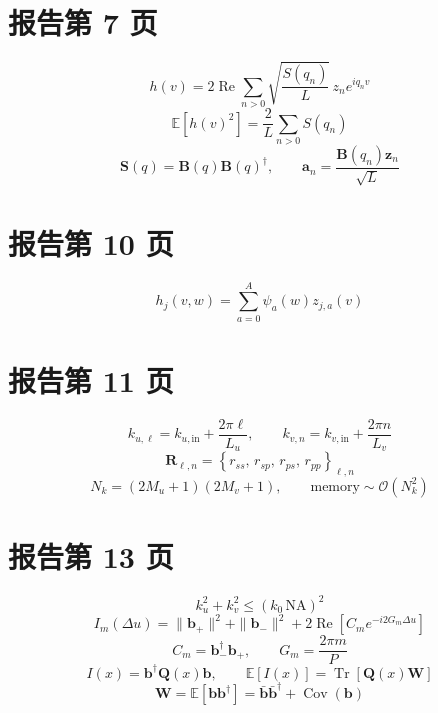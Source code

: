 \documentclass[UTF8,11pt,a4paper]{ctexart}
\begin{document}
\section*{报告第 7 页}
\begin{equation*}
 h(v)=2\operatorname{Re}\sum_{n>0}\sqrt{\frac{S(q_n)}{L}}\,z_n e^{iq_n v}
\end{equation*}
\begin{equation*}
 \mathbb{E}[h(v)^2]=\frac{2}{L}\sum_{n>0}S(q_n)
\end{equation*}
\begin{equation*}
 \mathbf{S}(q)=\mathbf{B}(q)\mathbf{B}(q)^\dagger,\qquad \mathbf{a}_n=\frac{\mathbf{B}(q_n)\mathbf{z}_n}{\sqrt L}
\end{equation*}

\section*{报告第 10 页}
\begin{equation*}
 h_j(v,w)=\sum_{a=0}^{A}\psi_a(w)z_{j,a}(v)
\end{equation*}

\section*{报告第 11 页}
\begin{equation*}
 k_{u,\ell}=k_{u,\mathrm{in}}+\frac{2\pi\ell}{L_u},\qquad k_{v,n}=k_{v,\mathrm{in}}+\frac{2\pi n}{L_v}
\end{equation*}
\begin{equation*}
 \mathbf{R}_{\ell,n}=\left\{r_{ss},\,r_{sp},\,r_{ps},\,r_{pp}\right\}_{\ell,n}
\end{equation*}
\begin{equation*}
 N_k=(2M_u+1)(2M_v+1),\qquad \text{memory}\sim\mathcal{O}(N_k^2)
\end{equation*}

\section*{报告第 13 页}
\begin{equation*}
 k_u^2+k_v^2\leq(k_0\,\mathrm{NA})^2
\end{equation*}
\begin{equation*}
 I_m(\Delta u)=\|\mathbf{b}_+\|^2+\|\mathbf{b}_-\|^2+2\operatorname{Re}\!\left[C_m e^{-i2G_m\Delta u}\right]
\end{equation*}
\begin{equation*}
 C_m=\mathbf{b}_-^\dagger\mathbf{b}_+,\qquad G_m=\frac{2\pi m}{P}
\end{equation*}
\begin{equation*}
 I(x)=\mathbf{b}^\dagger\mathbf{Q}(x)\mathbf{b},\qquad\mathbb{E}[I(x)]=\operatorname{Tr}\!\left[\mathbf{Q}(x)\mathbf{W}\right]
\end{equation*}
\begin{equation*}
 \mathbf{W}=\mathbb{E}[\mathbf{b}\mathbf{b}^\dagger]=\bar{\mathbf{b}}\bar{\mathbf{b}}^\dagger+\operatorname{Cov}(\mathbf{b})
\end{equation*}
\end{document}
